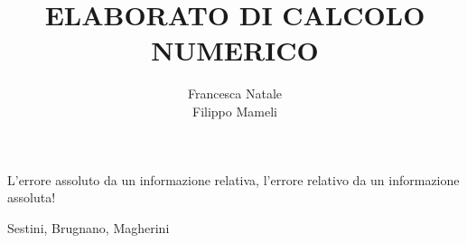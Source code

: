 \documentclass[a4paper, 10pt]{book}
\title{ELABORATO DI CALCOLO NUMERICO}
\author{Francesca Natale \\ Filippo Mameli \\}
\begin{document}
\maketitle
\tableofcontents

\cleardoublepage

\thispagestyle{empty}
\begin{flushright}
\epigraph{L'errore assoluto da un informazione relativa, l'errore relativo da un informazione assoluta!}{Sestini, Brugnano, Magherini}
\end{flushright}
\cleardoublepage












\end{document}
